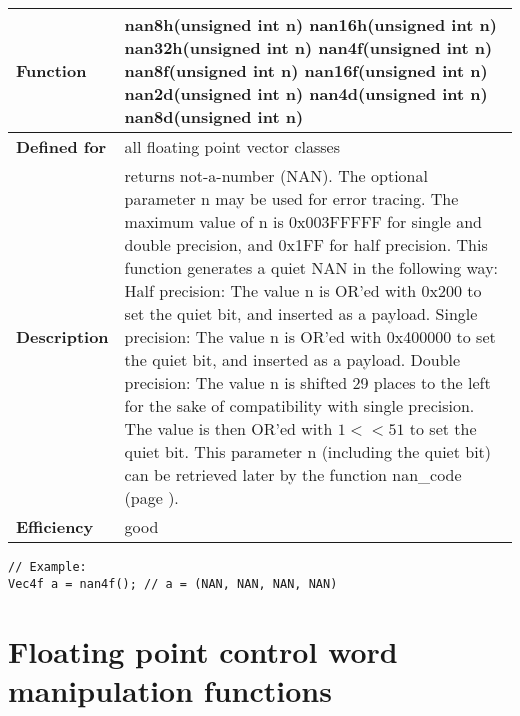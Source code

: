 \documentclass[vcl_manual.tex]{subfiles}
\begin{document}
\label{nan4f}
\begin{tabular}{|p{25mm}|p{100mm}|}
\hline
\bfseries Function & 
nan8h(unsigned int n) \newline
nan16h(unsigned int n) \newline
nan32h(unsigned int n) \newline
nan4f(unsigned int n) \newline
nan8f(unsigned int n) \newline
nan16f(unsigned int n) \newline
nan2d(unsigned int n) \newline
nan4d(unsigned int n) \newline
nan8d(unsigned int n) \\ \hline
\bfseries Defined for & all floating point vector classes \\ \hline
\bfseries Description & returns not-a-number (NAN). \newline
The optional parameter n may be used for error tracing. \newline
The maximum value of n is 0x003FFFFF for single and double precision, and 0x1FF for half precision.\newline
This function generates a quiet NAN in the following way:\newline
Half precision: The value n is OR'ed with 0x200 to set the quiet bit, and inserted as a payload.\newline
Single precision: The value n is OR'ed with 0x400000 to set the quiet bit, and inserted as a payload.\newline
Double precision: The value n is shifted 29 places to the left for the sake of compatibility with single precision. The value is then OR'ed with $1<<51$ to set the quiet bit.\newline
This parameter n (including the quiet bit) can be retrieved later by the function nan\_code (page \pageref{nanCode}). \\ \hline
\bfseries Efficiency & good \\ \hline
\end{tabular}
\begin{lstlisting}[frame=none]
// Example:
Vec4f a = nan4f(); // a = (NAN, NAN, NAN, NAN)
\end{lstlisting}


\section{Floating point control word manipulation functions}\label{FPControlWordManipulationFunctions}
\end{document}
